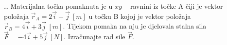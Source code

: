 \noindent 
\textbf{
\thecjelina.\thezadatak.}
Materijalna točka pomaknuta je u $xy-$ravnini iz točke A čiji je vektor položaja $\vec{r}_A=2\vec{i}+\vec{j}\ \left[m\right]$ u točku B kojoj je vektor položaja 
$\vec{r}_B=4\vec{i}+3\vec{j}\ \left[m\right]$. Tijekom pomaka na nju je djelovala stalna sila $\vec{F}=-4\vec{i}+5\vec{j}\ \left[N\right]$.
Izračunajte rad sile $\vec{F}$.

